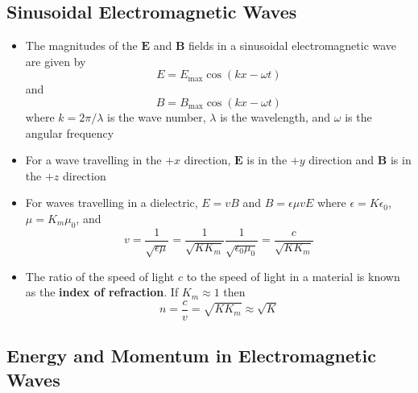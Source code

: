 \documentclass{article}
\begin{document}
\subsection{Sinusoidal Electromagnetic Waves}

\begin{itemize}
  \item The magnitudes of the $\mathbf{E}$ and $\mathbf{B}$ fields in a sinusoidal electromagnetic wave are given by \[E = E_\text{max} \cos (k x - \omega t)\] and \[B = B_\text{max} \cos (k x - \omega t)\] where $k = 2 \pi / \lambda$ is the wave number, $\lambda$ is the wavelength, and $\omega$ is the angular frequency

  \item For a wave travelling in the $+x$ direction, $\mathbf{E}$ is in the $+y$ direction and $\mathbf{B}$ is in the $+z$ direction

  \item For waves travelling in a dielectric, $E = v B$ and $B = \epsilon \mu v E$ where $\epsilon = K \epsilon_0$, $\mu = K_m \mu_0$, and \[v = \frac{1}{\sqrt{\epsilon \mu}} = \frac{1}{\sqrt{K K_m}} \frac{1}{\sqrt{\epsilon_0 \mu_0}} = \frac{c}{\sqrt{K K_m}}\]

  \item The ratio of the speed of light $c$ to the speed of light in a material is known as the \textbf{index of refraction}. If $K_m \approx 1$ then \[n = \frac{c}{v} = \sqrt{K K_m} \approx \sqrt{K}\]
\end{itemize}

\subsection{Energy and Momentum in Electromagnetic Waves}
\end{document}
